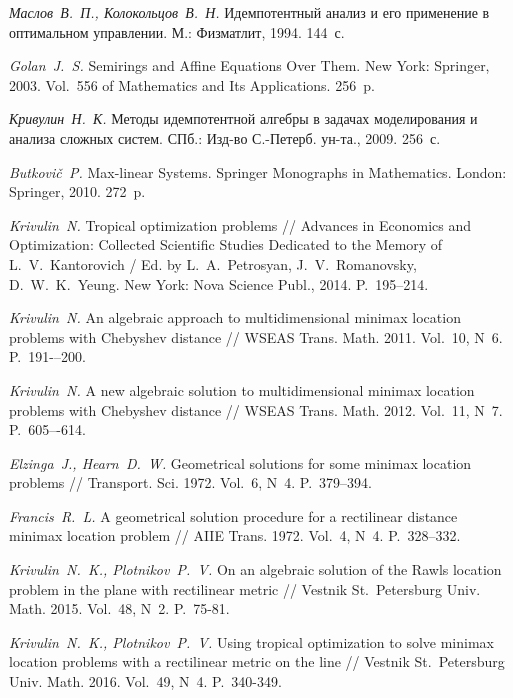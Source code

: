 \documentclass{spisok-article}
\begin{document}
\begin{thebibliography}{99}
	
	\textit{Маслов~В.~П., Колокольцов~В.~Н.}
	Идемпотентный анализ и его применение в оптимальном управлении.
	М.: Физматлит, 1994.
	144~с.
	
	\textit{Golan~J.~S.}
	Semirings and Affine Equations Over Them.
	New York: Springer, 2003.
	Vol.~556 of Mathematics and Its Applications.
	256~p.
	
	\textit{Кривулин~Н.~К.}
	Методы идемпотентной алгебры в задачах моделирования и анализа сложных систем.
	СПб.: Изд-во С.-Петерб. ун-та., 2009.
	256~с.
	
	\textit{Butkovi\v{c}~P.}
	Max-linear Systems. Springer Monographs in Mathematics.
	London: Springer, 2010.
	272~p.
	
	\textit{Krivulin~N.}
	Tropical optimization problems //
	Advances in Economics and Optimization: Collected Scientific Studies Dedicated to the Memory of L.~V.~Kantorovich /
	Ed. by L.~A.~Petrosyan, J.~V.~Romanovsky, D.~W.~K.~Yeung.
	New York: Nova Science Publ., 2014.
	P.~195--214.
	
	\textit{Krivulin~N.}
	 An algebraic approach to multidimensional minimax location problems with Chebyshev distance // 
	 WSEAS Trans. Math.
	 2011.
	 Vol.~10, N~6.
	 P.~191-–200.	
	 
	 \textit{Krivulin~N.}
	A new algebraic solution to multidimensional minimax location problems with Chebyshev distance // 
	 WSEAS Trans. Math.
	 2012.
	 Vol.~11, N~7.
	 P.~605–-614.
	
	\textit{Elzinga~J., Hearn~D.~W.}
	Geometrical solutions for some minimax location problems //
	Transport. Sci.
	1972.
	Vol.~6, N~4.
	P.~379--394.
	
	\textit{Francis~R.~L.}
	A geometrical solution procedure for a rectilinear distance minimax location problem //
	AIIE Trans.
	1972.
	Vol.~4, N~4.
	P.~328--332.
	
	\textit{Krivulin~N.~K., Plotnikov~P.~V.}
	On an algebraic solution of the Rawls location problem in the plane with rectilinear metric //
	Vestnik St.~Petersburg Univ. Math.
	2015.
	Vol.~48, N~2.
	P.~75-81.
	
	\textit{Krivulin~N.~K., Plotnikov~P.~V.}
	Using tropical optimization to solve minimax location
	problems with a rectilinear metric on the line //
	Vestnik St.~Petersburg Univ. Math.
	2016.
	Vol.~49, N~4.
	P.~340-349.	
	
\end{thebibliography}
\end{document}

